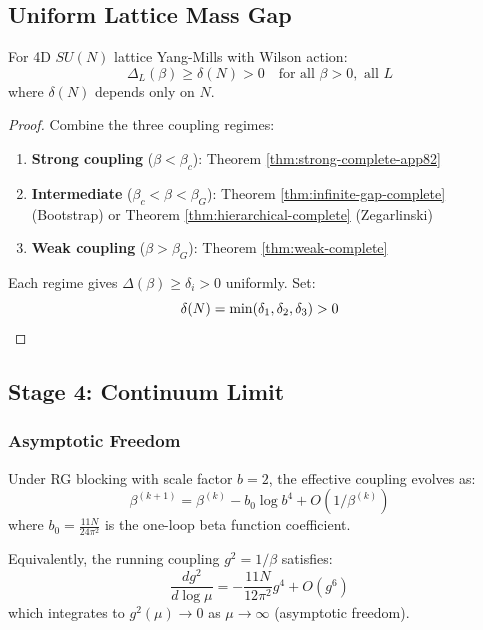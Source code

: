\subsection{Uniform Lattice Mass Gap}

\begin{tcolorbox}[colback=blue!10,colframe=blue!60!black,title=\textbf{Lattice Mass Gap Theorem}]
\begin{theorem}
\label{thm:lattice-complete}
For 4D $SU(N)$ lattice Yang-Mills with Wilson action:
\[
\boxed{\Delta_L(\beta) \geq \delta(N) > 0 \quad \text{for all } \beta > 0, \text{ all } L}
\]
where $\delta(N)$ depends only on $N$.
\end{theorem}
\end{tcolorbox}

\begin{proof}
Combine the three coupling regimes:
\begin{enumerate}
\item \textbf{Strong coupling} ($\beta < \beta_c$): Theorem \ref{thm:strong-complete-app82}
\item \textbf{Intermediate} ($\beta_c < \beta < \beta_G$): Theorem \ref{thm:infinite-gap-complete} 
(Bootstrap) or Theorem \ref{thm:hierarchical-complete} (Zegarlinski)
\item \textbf{Weak coupling} ($\beta > \beta_G$): Theorem \ref{thm:weak-complete}
\end{enumerate}

Each regime gives $\Delta(\beta) \geq \delta_i > 0$ uniformly. Set:
\[
\delta(N) = \min(\delta_1, \delta_2, \delta_3) > 0 \qedhere
\]
\end{proof}

\subsection{Stage 4: Continuum Limit}

\subsubsection{Asymptotic Freedom}

\begin{theorem}
\label{thm:AF-complete}
Under RG blocking with scale factor $b=2$, the effective coupling evolves as:
\[
\beta^{(k+1)} = \beta^{(k)} - b_0 \log b^4 + O(1/\beta^{(k)})
\]
where $b_0 = \frac{11N}{24\pi^2}$ is the one-loop beta function coefficient.

Equivalently, the running coupling $g^2 = 1/\beta$ satisfies:
\[
\frac{dg^2}{d\log\mu} = -\frac{11N}{12\pi^2} g^4 + O(g^6)
\]
which integrates to $g^2(\mu) \to 0$ as $\mu \to \infty$ (asymptotic freedom).
\end{theorem}

